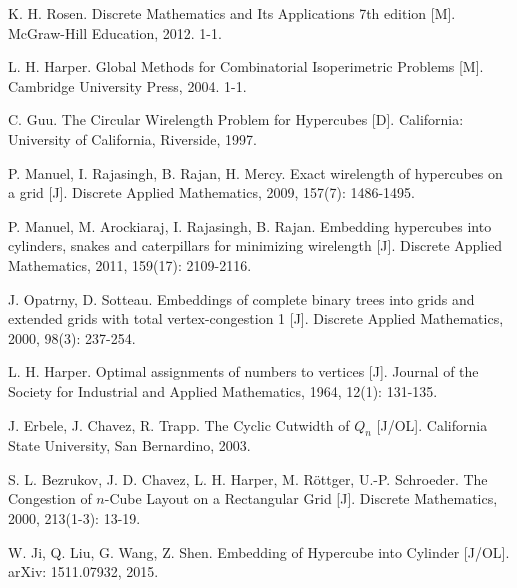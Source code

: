 
\begin{thebibliography}{99}

	K. H. Rosen.
	Discrete Mathematics and Its Applications 7th edition [M].
	McGraw-Hill Education, 2012. 1-1. %

	L. H. Harper.
	Global Methods for Combinatorial Isoperimetric Problems [M].
	Cambridge University Press, 2004. 1-1. %

	C. Guu.
	The Circular Wirelength Problem for Hypercubes [D].
	California: University of California, Riverside, 1997.

	P. Manuel, I. Rajasingh, B. Rajan, H. Mercy.
	Exact wirelength of hypercubes on a grid [J].
	Discrete Applied Mathematics, 2009, 157(7): 1486-1495.

	P. Manuel, M. Arockiaraj, I. Rajasingh, B. Rajan.
	Embedding hypercubes into cylinders, snakes and caterpillars for
	minimizing wirelength [J].
	Discrete Applied Mathematics, 2011, 159(17): 2109-2116.

	J. Opatrny, D. Sotteau.
	Embeddings of complete binary trees into grids and extended grids
	with total vertex-congestion 1 [J].
	Discrete Applied Mathematics, 2000, 98(3): 237-254.

	L. H. Harper.
	Optimal assignments of numbers to vertices [J].
	Journal of the Society for Industrial and Applied Mathematics,
	1964, 12(1): 131-135.

	J. Erbele, J. Chavez, R. Trapp.
	The Cyclic Cutwidth of $Q_n$ [J/OL].
	California State University, San Bernardino, 2003.

	S. L. Bezrukov, J. D. Chavez, L. H. Harper, M. Röttger, U.-P. Schroeder.
	The Congestion of $n$-Cube Layout on a Rectangular Grid [J].
	Discrete Mathematics, 2000, 213(1-3): 13-19.

	W. Ji, Q. Liu, G. Wang, Z. Shen.
	Embedding of Hypercube into Cylinder [J/OL].
	arXiv: 1511.07932, 2015.

\end{thebibliography}
